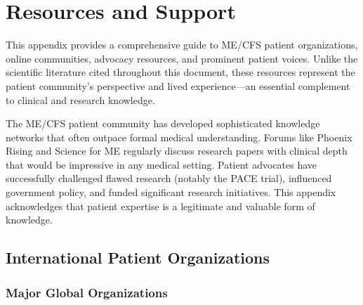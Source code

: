 \chapter{Resources and Support}
\label{app:resources}

This appendix provides a comprehensive guide to ME/CFS patient organizations, online communities, advocacy resources, and prominent patient voices. Unlike the scientific literature cited throughout this document, these resources represent the patient community's perspective and lived experience---an essential complement to clinical and research knowledge.

\begin{observation}
The ME/CFS patient community has developed sophisticated knowledge networks that often outpace formal medical understanding. Forums like Phoenix Rising and Science for ME regularly discuss research papers with clinical depth that would be impressive in any medical setting. Patient advocates have successfully challenged flawed research (notably the PACE trial), influenced government policy, and funded significant research initiatives. This appendix acknowledges that patient expertise is a legitimate and valuable form of knowledge.
\end{observation}

\section{International Patient Organizations}
\label{sec:international-orgs}

\subsection{Major Global Organizations}


